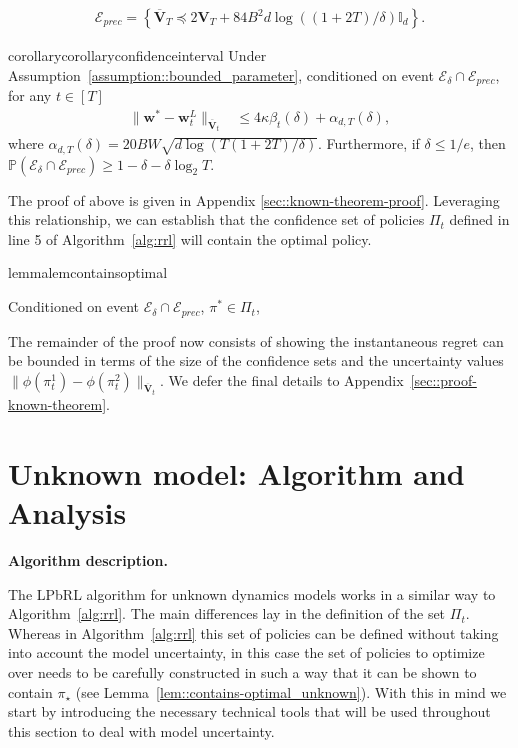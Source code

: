 \begin{align*}
    \mathcal E_{prec} = \left\{ \overline {\mathbf V}_T  \preceq  2{\mathbf V}_T + 84 B^2 d \log((1 + 2 T)/\delta) \mathbb{I}_d \right\}.
\end{align*}

\begin{restatable}{corollary}{corollaryconfidenceinterval}
\label{corollary::V_bar_bound}
Under Assumption~\ref{assumption::bounded_parameter}, conditioned on event $\mathcal E_\delta \cap \mathcal E_{prec}$, for any $t \in [T]$ 
\begin{align*}
    \| {\mathbf w}^* - {\mathbf w}^L_t \|_{  \overline {\mathbf V}_t } & \leq 4 \kappa \beta_t(\delta) + \alpha_{d, T}(\delta),
\end{align*}
where  $\alpha_{d,T}(\delta) = 20 B W\sqrt{d \log(T(1 + 2 T)/\delta)}$.  
Furthermore, if $\delta \leq 1/e$, then $\mathbb P (\mathcal E_\delta \cap \mathcal E_{prec}) \geq 1 - \delta - \delta\log_2T$.

\end{restatable}

The proof of above is given in Appendix \ref{sec::known-theorem-proof}. Leveraging this relationship, we can establish that the confidence set of policies $\Pi_t$ defined in line 5 of Algorithm~\ref{alg:rrl} will contain the optimal policy.

\begin{restatable}{lemma}{lemcontainsoptimal}\label{lem::contains-optimal}

Conditioned on event $\mathcal E_\delta \cap \mathcal E_{prec}$, $\pi^* \in \Pi_t$,

\end{restatable}

The remainder of the proof now consists of showing the instantaneous regret can be bounded in terms of the size of the confidence sets and the uncertainty values $\| \phi(\pi^1_t) - \phi(\pi^2_t) \|_{\overline {\mathbf V}_t}$. We defer the final details to Appendix~\ref{sec::proof-known-theorem}.

\section{Unknown model: Algorithm and Analysis}
\label{sec:ub}
\label{sec:unknown-model}

\textbf{Algorithm description. }

The LPbRL algorithm for unknown dynamics models works in a similar way to Algorithm~\ref{alg:rrl}. The main differences lay in the definition of the set $\Pi_t$. Whereas in Algorithm~\ref{alg:rrl} this set of policies can be defined without taking into account the model uncertainty, in this case the set of policies to optimize over needs to be carefully constructed in such a way that it can be shown to contain $\pi_\star$ (see Lemma~\ref{lem::contains-optimal_unknown}). With this in mind we start by introducing the necessary technical tools that will be used throughout this section to deal with model uncertainty.


